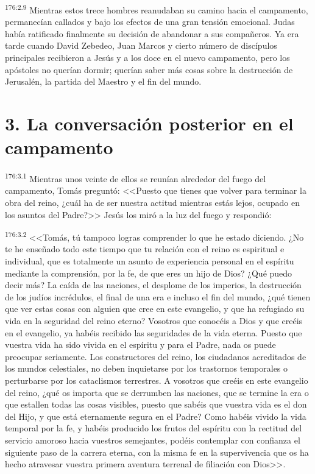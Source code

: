 \par 
\textsuperscript{176:2.9} Mientras estos trece hombres reanudaban su camino hacia el campamento, permanecían callados y bajo los efectos de una gran tensión emocional. Judas había ratificado finalmente su decisión de abandonar a sus compañeros. Ya era tarde cuando David Zebedeo, Juan Marcos y cierto número de discípulos principales recibieron a Jesús y a los doce en el nuevo campamento, pero los apóstoles no querían dormir; querían saber más cosas sobre la destrucción de Jerusalén, la partida del Maestro y el fin del mundo.

\section*{3. La conversación posterior en el campamento}
\par 
\textsuperscript{176:3.1} Mientras unos veinte de ellos se reunían alrededor del fuego del campamento, Tomás preguntó: <<Puesto que tienes que volver para terminar la obra del reino, ¿cuál ha de ser nuestra actitud mientras estás lejos, ocupado en los asuntos del Padre?>> Jesús los miró a la luz del fuego y respondió:

\par 
\textsuperscript{176:3.2} <<Tomás, tú tampoco logras comprender lo que he estado diciendo. ¿No te he enseñado todo este tiempo que tu relación con el reino es espiritual e individual, que es totalmente un asunto de experiencia personal en el espíritu mediante la comprensión, por la fe, de que eres un hijo de Dios? ¿Qué puedo decir más? La caída de las naciones, el desplome de los imperios, la destrucción de los judíos incrédulos, el final de una era e incluso el fin del mundo, ¿qué tienen que ver estas cosas con alguien que cree en este evangelio, y que ha refugiado su vida en la seguridad del reino eterno? Vosotros que conocéis a Dios y que creéis en el evangelio, ya habéis recibido las seguridades de la vida eterna. Puesto que vuestra vida ha sido vivida en el espíritu y para el Padre, nada os puede preocupar seriamente. Los constructores del reino, los ciudadanos acreditados de los mundos celestiales, no deben inquietarse por los trastornos temporales o perturbarse por los cataclismos terrestres. A vosotros que creéis en este evangelio del reino, ¿qué os importa que se derrumben las naciones, que se termine la era o que estallen todas las cosas visibles, puesto que sabéis que vuestra vida es el don del Hijo, y que está eternamente segura en el Padre? Como habéis vivido la vida temporal por la fe, y habéis producido los frutos del espíritu con la rectitud del servicio amoroso hacia vuestros semejantes, podéis contemplar con confianza el siguiente paso de la carrera eterna, con la misma fe en la supervivencia que os ha hecho atravesar vuestra primera aventura terrenal de filiación con Dios>>.

